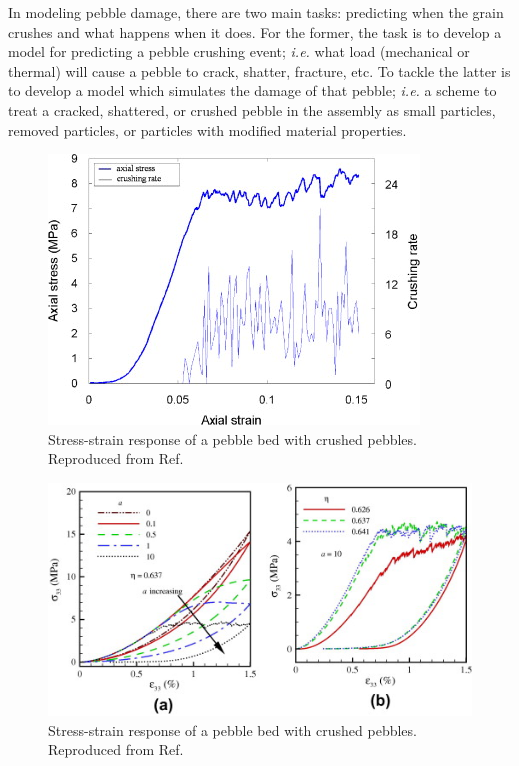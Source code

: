 In modeling pebble damage, there are two main tasks: predicting when the grain crushes and what happens when it does. For the former, the task is to develop a model for predicting a pebble crushing event; \textit{i.e.} what load (mechanical or thermal) will cause a pebble to crack, shatter, fracture, etc. To tackle the latter is to develop a model which simulates the damage of that pebble; \textit{i.e.} a scheme to treat a cracked, shattered, or crushed pebble in the assembly as small particles, removed particles, or particles with modified material properties.

\begin{figure}[!t]
\centering
	\includegraphics[width=\singleimagewidth]{chapters/figures/markets-bolton-stress-strain-crushing.jpg}
	\caption{Stress-strain response of a pebble bed with crushed pebbles. Reproduced from Ref.~\cite{Marketos2007}}
	\label{fig:marketos-bolton-stress-strain}
\end{figure}

\begin{figure}[!t]
\centering
	\includegraphics[width=\singleimagewidth]{chapters/figures/annabattula-stress-strain-crushing.jpg}
	\caption{Stress-strain response of a pebble bed with crushed pebbles. Reproduced from Ref.~\cite{Annabattula2012a}}
	\label{fig:annabattula-stress-strain}
\end{figure}


